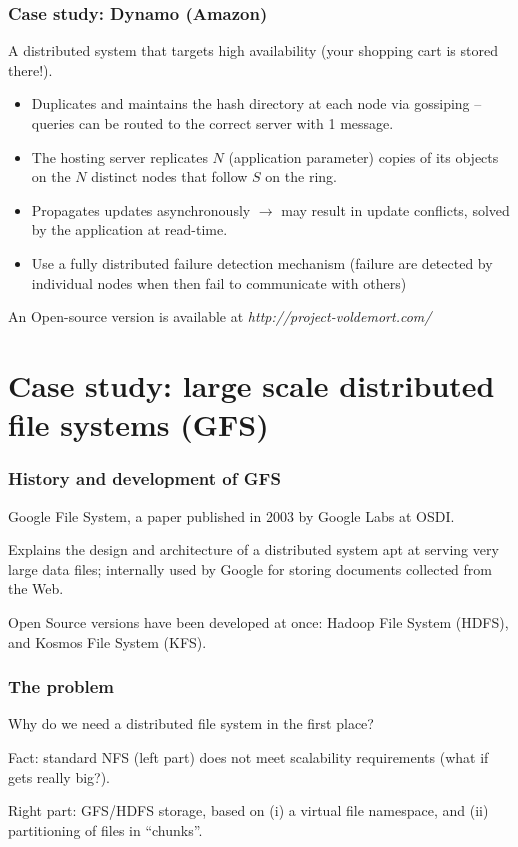 \documentclass{beamer}
\begin{document}
\begin{frame}
\frametitle{Case study: Dynamo (Amazon)}

A distributed system that targets high availability (your shopping cart is
stored there!).

\begin{itemize}
  \item Duplicates and maintains the hash directory at \alert{each
   node} via \alert{gossiping} --
  queries can be routed to the correct server with 1 message.
  
  \item The hosting server replicates $N$ (application parameter) copies of its
  objects on the $N$ \alert{distinct} nodes that follow $S$ on the ring.
  
  \item Propagates updates \alert{asynchronously} $\to$ may result in 
     update conflicts, solved by the application at read-time.
     
     \item Use a fully distributed failure detection mechanism (failure are
     detected by individual nodes when then fail to communicate with others)
\end{itemize}

An Open-source version is available at
\textit{http://project-voldemort.com/}
\end{frame}


\section{Case study: large scale distributed file systems (GFS)}


\begin{frame}
\frametitle{History and development of GFS}

Google File System, a paper published in 2003 by Google Labs at OSDI.

\vfill

Explains the design and architecture of a distributed system apt at 
serving very large data files; internally used by Google for storing documents
collected from the Web.

\vfill

Open Source versions have been developed at once: Hadoop File System (HDFS),
and Kosmos File System (KFS).

\end{frame}


\begin{frame}
\frametitle{The problem}

Why do we need a distributed file system in the first place?

\vfill

Fact: standard NFS (left part) does not meet  scalability requirements
(what if  gets really big?).


Right part: GFS/HDFS storage, based on (i) a virtual file namespace, and
(ii)  partitioning of files in ``chunks''.

\end{frame}
\end{document}
